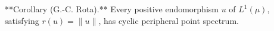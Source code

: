 **Corollary (G.-C. Rota).** Every positive endomorphism $u$ of $L^1(\mu)$, satisfying $r(u) = \|u\|$, has cyclic peripheral point spectrum.
